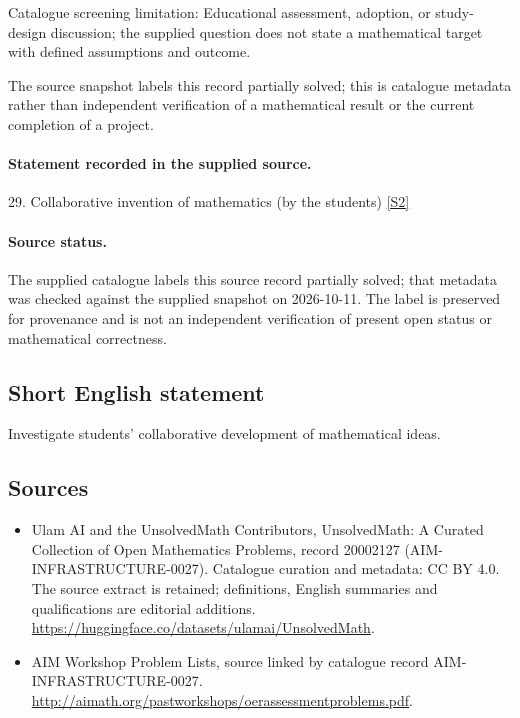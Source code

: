 \documentclass[11pt]{article}
\begin{document}
Catalogue screening limitation: Educational assessment, adoption, or study-design discussion; the supplied question does not state a mathematical target with defined assumptions and outcome.

The source snapshot labels this record partially solved; this is catalogue metadata rather than independent verification of a mathematical result or the current completion of a project.
\paragraph{Statement recorded in the supplied source.}
29. Collaborative invention of mathematics (by the students) \href{http://aimath.org/pastworkshops/oerassessmentproblems.pdf}{[S2]}
\paragraph{Source status.}
The supplied catalogue labels this source record partially solved; that metadata was checked against the supplied snapshot on 2026-10-11. The label is preserved for provenance and is not an independent verification of present open status or mathematical correctness.
\subsection{Short English statement}
Investigate students' collaborative development of mathematical ideas.
\subsection{Sources}
\begin{itemize}
\item[S1] Ulam AI and the UnsolvedMath Contributors, UnsolvedMath: A Curated Collection of Open Mathematics Problems, record 20002127 (AIM-INFRASTRUCTURE-0027). Catalogue curation and metadata: CC BY 4.0. The source extract is retained; definitions, English summaries and qualifications are editorial additions.
\url{https://huggingface.co/datasets/ulamai/UnsolvedMath}.
\item[S2] AIM Workshop Problem Lists, source linked by catalogue record AIM-INFRASTRUCTURE-0027.
\url{http://aimath.org/pastworkshops/oerassessmentproblems.pdf}.
\end{itemize}
\end{document}
